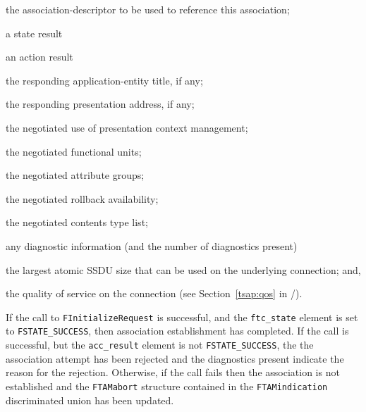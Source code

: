 \begin{describe}
\item[\verb"ftc\_sd":] the association-descriptor to be used to reference
this association;

\item[\verb"ftc\_state":] a state result

\item[\verb"ftc\_action":] an action result

\item[\verb"ftc\_respondtitle":] the responding application-entity title, if
any;

\item[\verb"ftc\_respondaddr":] the responding presentation address, if any;

\item[\verb"ftc\_manage":] the negotiated use of presentation context
management;

\item[\verb"ftc\_units":] the negotiated functional units;

\item[\verb"ftc\_attrs":] the negotiated attribute groups;

\item[\verb"ftc\_rollback":] the negotiated rollback availability;

\item[\verb"ftc\_contents":] the negotiated contents type list;

\item[\verb"ftc\_diags"/\verb"ftc\_ndiag":] any diagnostic information
(and the number of diagnostics present)

\item[\verb"ftc\_ssdusize":] the largest atomic SSDU size that can be used
on the underlying connection;
and,

\item[\verb"ftc\_qos":] the quality of service on the connection
(see Section~\ref{tsap:qos} in \voltwo/).
\end{describe}
If the call to \verb"FInitializeRequest" is successful,
and the \verb"ftc_state" element is set to \verb"FSTATE_SUCCESS",
then association establishment has completed.
If the call is successful,
but the \verb"acc_result" element is not \verb"FSTATE_SUCCESS",
the the association attempt has been rejected
and the diagnostics present indicate the reason for the rejection.
Otherwise, if the call fails then the association is not established and
the \verb"FTAMabort" structure contained in the \verb"FTAMindication"
discriminated union has been updated.


